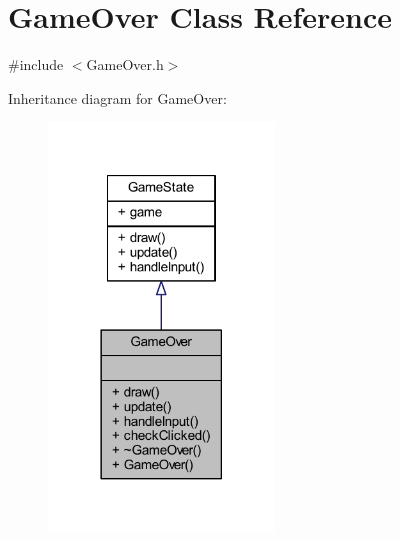\hypertarget{class_game_over}{}\section{Game\+Over Class Reference}
\label{class_game_over}


{\ttfamily \#include $<$Game\+Over.\+h$>$}



Inheritance diagram for Game\+Over\+:
\nopagebreak
\begin{figure}[H]
\begin{center}
\leavevmode
\includegraphics[width=170pt]{class_game_over__inherit__graph}
\end{center}
\end{figure}


